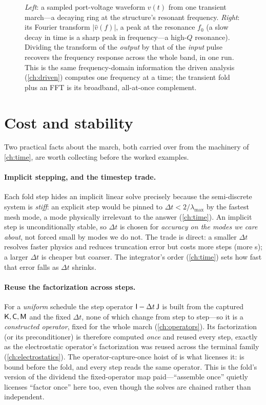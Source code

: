 \begin{figure}[t]
{\emph{Left}: a sampled port-voltage waveform $v(t)$ from one transient march---a
decaying ring at the structure's resonant frequency. \emph{Right}: its Fourier
transform $|\hat v(f)|$, a peak at the resonance $f_0$ (a slow decay in time is a
sharp peak in frequency---a high-$Q$ resonance). Dividing the transform of the
\emph{output} by that of the \emph{input} pulse recovers the frequency response
across the whole band, in one run. This is the same frequency-domain information the
driven analysis (\cref{ch:driven}) computes one frequency at a time; the transient
fold plus an FFT is its broadband, all-at-once complement.}
\label{fig:tr-fourier}
\end{figure}

\section{Cost and stability}
\label{sec:tr-cost}

Two practical facts about the march, both carried over from the machinery of
\cref{ch:time}, are worth collecting before the worked examples.

\paragraph{Implicit stepping, and the timestep trade.} Each fold step hides an
implicit linear solve precisely because the semi-discrete system is \emph{stiff}: an
explicit step would be pinned to $\Delta t<2/\lambda_{\max}$ by the fastest mesh
mode, a mode physically irrelevant to the answer (\cref{ch:time}). An implicit step
is unconditionally stable, so $\Delta t$ is chosen for \emph{accuracy on the modes we
care about}, not forced small by modes we do not. The trade is direct: a smaller
$\Delta t$ resolves faster physics and reduces truncation error but costs more steps
(more s); a larger $\Delta t$ is cheaper but coarser. The integrator's
order (\cref{ch:time}) sets how fast that error falls as $\Delta t$ shrinks.

\paragraph{Reuse the factorization across steps.} For a \emph{uniform} schedule the
step operator $\mathsf{I}-\Delta t\,\mathsf{J}$ is built from the captured $\mathsf{K},\mathsf{C},\mathsf{M}$
and the fixed $\Delta t$, none of which change from step to step---so it is a
\emph{constructed operator}, fixed for the whole march (\cref{ch:operators}). Its
factorization (or its preconditioner) is therefore computed \emph{once} and reused
every step, exactly as the electrostatic operator's factorization was reused across
the terminal family (\cref{ch:electrostatics}). The operator-capture-once hoist of
 is what licenses it:  is bound before the fold, and every
step reads the same operator. This is the fold's version of the dividend the
fixed-operator map paid---``assemble once'' quietly licenses ``factor once'' here too,
even though the solves are chained rather than independent.

